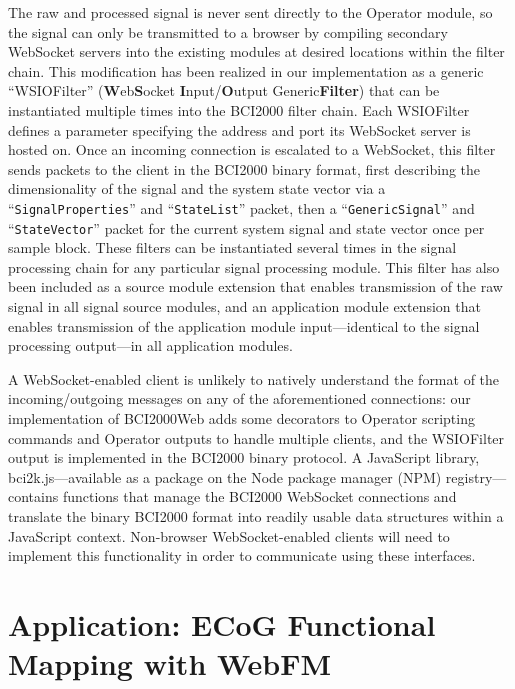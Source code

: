 \documentclass[utf8]{frontiersSCNS}
\begin{document}
The raw and processed signal is never sent directly to the Operator module, so the signal can only be transmitted to a browser by compiling secondary WebSocket servers into the existing modules at desired locations within the filter chain.
This modification has been realized in our implementation as a generic ``WSIOFilter'' (\textbf{W}eb\textbf{S}ocket \textbf{I}nput/\textbf{O}utput Generic\textbf{Filter}) that can be instantiated multiple times into the BCI2000 filter chain.
Each WSIOFilter defines a parameter specifying the address and port its WebSocket server is hosted on.
Once an incoming connection is escalated to a WebSocket, this filter sends packets to the client in the BCI2000 binary format, first describing the dimensionality of the signal and the system state vector via a ``\texttt{SignalProperties}'' and ``\texttt{StateList}'' packet, then a ``\texttt{GenericSignal}'' and ``\texttt{StateVector}'' packet for the current system signal and state vector once per sample block.
These filters can be instantiated several times in the signal processing chain for any particular signal processing module.
This filter has also been included as a source module extension that enables transmission of the raw signal in all signal source modules, and an application module extension that enables transmission of the application module input---identical to the signal processing output---in all application modules.

A WebSocket-enabled client is unlikely to natively understand the format of the incoming/outgoing messages on any of the aforementioned connections: our implementation of BCI2000Web adds some decorators to Operator scripting commands and Operator outputs to handle multiple clients, and the WSIOFilter output is implemented in the BCI2000 binary protocol.
A JavaScript library, bci2k.js---available as a package on the Node package manager (NPM) registry---contains functions that manage the BCI2000 WebSocket connections and translate the binary BCI2000 format into readily usable data structures within a JavaScript context.
Non-browser WebSocket-enabled clients will need to implement this functionality in order to communicate using these interfaces.



\section{Application: ECoG Functional Mapping with WebFM}
\end{document}
